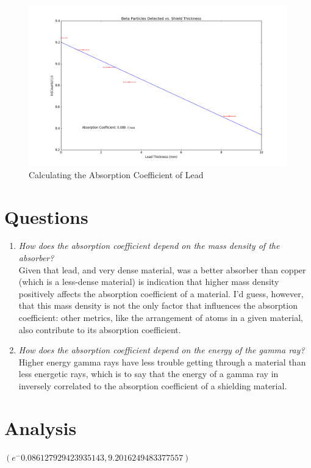 \documentclass{amsart}
\begin{document}
\begin{figure}[H]
    \centering
    \includegraphics[width=\textwidth]{fitted.png}
    \caption{Calculating the Absorption Coefficient of Lead}
\end{figure}

\section{Questions}

\begin{enumerate}
    \item {\textit{How does the absorption coefficient depend on the mass density of the absorber?}\\
        Given that lead, and very dense material, was a better absorber than copper (which is a less-dense material) is indication that higher mass density positively affects the absorption coefficient of a material. I'd guess, however, that this mass density is not the only factor that influences the absorption coefficient: other metrics, like the arrangement of atoms in a given material, also contribute to its absorption coefficient.
    }
    \item {\textit{How does the absorption coefficient depend on the energy of the gamma ray?}\\
        Higher energy gamma rays have less trouble getting through a material than less energetic rays, which is to say that the energy of a gamma ray in inversely correlated to the absorption coefficient of a shielding material.
    }
\end{enumerate}
\section{Analysis}


$(e^-0.086127929423935143, 9.2016249483377557)$
\end{document}
